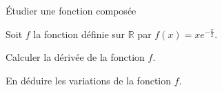     \begin{bmethodet}{Étudier une fonction composée}
    	
    	Soit $f$ la fonction définie sur $\mathbb{R}$ par $f(x)=x e^{-\frac{x}{2}}$.
   		\begin{enumMet}
   			\item Calculer la dérivée de la fonction $f$.
   			\item En déduire les variations de la fonction $f$.
   		\end{enumMet}
    	
    	
    	\begin{enumMet}
    		\item {}\pointilles[\textwidth-0.5cm]
    		
    		\pointilles[\textwidth-0.5cm]
    		
    		\pointilles[\textwidth-0.5cm]
    		
    		\pointilles[\textwidth-0.5cm]
    		
    		\item {}\pointilles[\textwidth-0.5cm]
    		
    		\pointilles[\textwidth-0.5cm]
    		
    		\pointilles[\textwidth-0.5cm]
    		
    		\pointilles[\textwidth-0.5cm]
    	\end{enumMet}
    \end{bmethodet}
    
    



